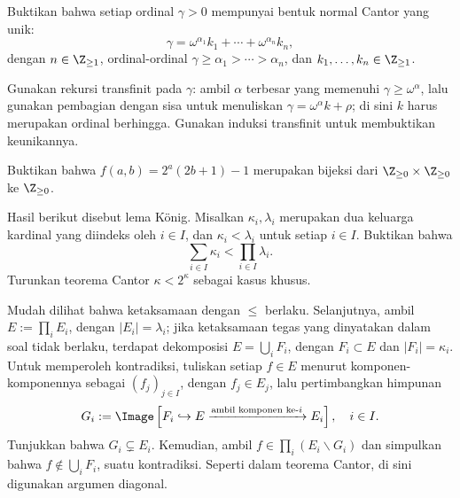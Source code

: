 \begin{Exercises}
	\item Buktikan bahwa setiap ordinal $\gamma > 0$ mempunyai bentuk normal Cantor yang unik:
		\[ \gamma= \omega^{\alpha_1} k_1 + \cdots + \omega^{\alpha_n} k_n, \]
		dengan $n \in \Z_{\geq 1}$, ordinal-ordinal $\gamma \geq \alpha_1 > \cdots > \alpha_n$, dan $k_1, \ldots, k_n \in \Z_{\geq 1}$. \begin{hint} Gunakan rekursi transfinit pada $\gamma$: ambil $\alpha$ terbesar yang memenuhi $\gamma \geq \omega^\alpha $, lalu gunakan pembagian dengan sisa untuk menuliskan $\gamma = \omega^\alpha k + \rho$; di sini $k$ harus merupakan ordinal berhingga. Gunakan induksi transfinit untuk membuktikan keunikannya.\end{hint}
	\item Buktikan bahwa $f(a,b) = 2^a(2b+1)-1$ merupakan bijeksi dari $\Z_{\geq 0} \times \Z_{\geq 0}$ ke $\Z_{\geq 0}$.
	\item Hasil berikut disebut lema König. Misalkan $\kappa_i, \lambda_i$ merupakan dua keluarga kardinal yang diindeks oleh $i \in I$, dan $\kappa_i < \lambda_i$ untuk setiap $i \in I$. Buktikan bahwa
		\[ \sum_{i \in I} \kappa_i < \prod_{i \in I} \lambda_i. \]
		Turunkan teorema Cantor $\kappa < 2^\kappa$ sebagai kasus khusus.
		\begin{hint}
			Mudah dilihat bahwa ketaksamaan dengan $\leq$ berlaku. Selanjutnya, ambil $E := \prod_i E_i$, dengan $|E_i| = \lambda_i$; jika ketaksamaan tegas yang dinyatakan dalam soal tidak berlaku, terdapat dekomposisi $E = \bigcup_i F_i$, dengan $F_i \subset E$ dan $|F_i| = \kappa_i$. Untuk memperoleh kontradiksi, tuliskan setiap $f \in E$ menurut komponen-komponennya sebagai $(f_j)_{j \in I}$, dengan $f_j \in E_j$, lalu pertimbangkan himpunan
			\[ G_i := \Image\left[ F_i \hookrightarrow E \xrightarrow{\text{ambil komponen ke-$i$}} E_i \right], \quad i \in I. \]
			Tunjukkan bahwa $G_i \subsetneq E_i$. Kemudian, ambil $f \in \prod_i (E_i \smallsetminus G_i)$ dan simpulkan bahwa $f \notin \bigcup_i F_i$, suatu kontradiksi. Seperti dalam teorema Cantor, di sini digunakan argumen diagonal.
		\end{hint}
\end{Exercises}
